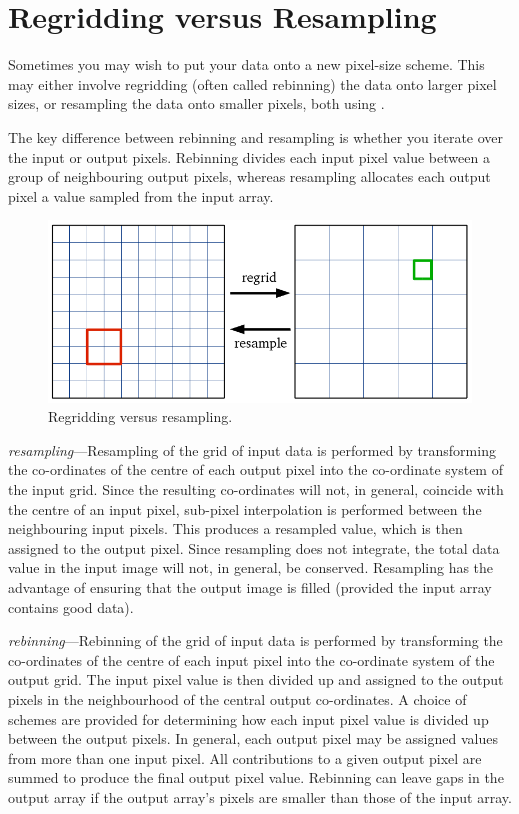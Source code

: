\documentclass[11pt,oneside,chapters]{starlink}
\begin{document}
\chapter{Regridding versus Resampling}
\label{app:regrid}

Sometimes you may wish to put your data onto a new pixel-size scheme.
This may either involve regridding (often called rebinning) the data
onto larger pixel sizes, or resampling the data onto smaller pixels,
both using \Kappa.

The key difference between rebinning and resampling is whether you
iterate over the input or output pixels.  Rebinning divides each input
pixel value between a group of neighbouring output pixels, whereas
resampling allocates each output pixel a value sampled from the input
array.

\begin{figure}[h!]
\begin{center}
\includegraphics[width=0.8\linewidth]{sc20_regrid}
\caption{\label{fig:regrid}
  Regridding versus resampling.}
\end{center}
\end{figure}

\emph{resampling}---Resampling of the grid of input data is performed
by transforming the co-ordinates of the centre of each output pixel
into the co-ordinate system of the input grid. Since the resulting
co-ordinates will not, in general, coincide with the centre of an
input pixel, sub-pixel interpolation is performed between the
neighbouring input pixels. This produces a resampled value, which is
then assigned to the output pixel.  Since resampling does not
integrate, the total data value in the input image will not, in
general, be conserved.  Resampling has the advantage of ensuring that
the output image is filled (provided the input array contains good
data).


\emph{rebinning}---Rebinning of the grid of input data is performed by
transforming the co-ordinates of the centre of each input pixel
into the co-ordinate system of the output grid.
The input pixel value is then divided up and assigned to the
output pixels in the neighbourhood of the central output
co-ordinates. A choice of schemes are provided for determining
how each input pixel value is divided up between the output
pixels. In general, each output pixel may be assigned values
from more than one input pixel. All contributions to a given
output pixel are summed to produce the final output pixel value.
Rebinning can leave gaps in the output array if the output
array's pixels are smaller than those of the input array.
\end{document}
